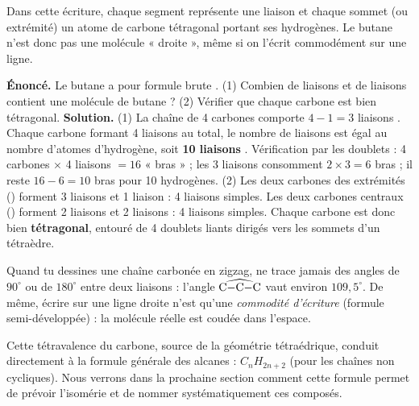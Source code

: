 \documentclass[11pt]{article}
\begin{document}
\begin{center}
\end{center}

Dans cette écriture, chaque segment représente une liaison  et chaque sommet (ou extrémité) un atome de carbone tétragonal portant ses hydrogènes. Le butane n'est donc pas une molécule « droite », même si on l'écrit commodément  sur une ligne.

\begin{exoresolu}
\textbf{Énoncé.} Le butane a pour formule brute . (1) Combien de liaisons  et de liaisons  contient une molécule de butane ? (2) Vérifier que chaque carbone est bien tétragonal.
\tcblower
\textbf{Solution.} (1) La chaîne de 4 carbones comporte $4 - 1 = 3$ liaisons . Chaque carbone formant 4 liaisons au total, le nombre de liaisons  est égal au nombre d'atomes d'hydrogène, soit \textbf{10 liaisons }. Vérification par les doublets : 4 carbones $\times$ 4 liaisons $= 16$ « bras » ; les 3 liaisons  consomment $2 \times 3 = 6$ bras ; il reste $16 - 6 = 10$ bras pour 10 hydrogènes. (2) Les deux carbones des extrémités () forment 3 liaisons  et 1 liaison  : 4 liaisons simples. Les deux carbones centraux () forment 2 liaisons  et 2 liaisons  : 4 liaisons simples. Chaque carbone est donc bien \textbf{tétragonal}, entouré de 4 doublets liants dirigés vers les sommets d'un tétraèdre.
\end{exoresolu}

\begin{attention}
Quand tu dessines une chaîne carbonée en zigzag, ne trace jamais des angles de $90^{\circ}$ ou de $180^{\circ}$ entre deux liaisons  : l'angle $\widehat{\ce{C-C-C}}$ vaut environ $109,5^{\circ}$. De même, écrire  sur une ligne droite n'est qu'une \emph{commodité d'écriture} (formule semi-développée) : la molécule réelle est coudée dans l'espace.
\end{attention}

Cette tétravalence du carbone, source de la géométrie tétraédrique, conduit directement à la formule générale des alcanes : \textbf{$C_nH_{2n+2}$} (pour les chaînes non cycliques). Nous verrons dans la prochaine section comment cette formule permet de prévoir l'isomérie et de nommer systématiquement ces composés.
\end{document}
